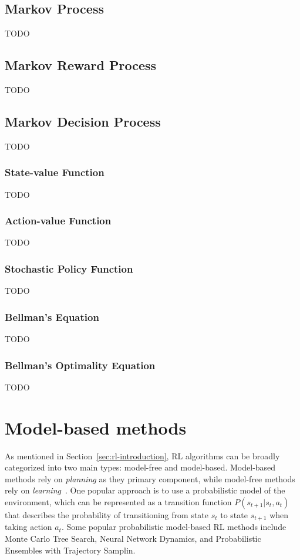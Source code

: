 \documentclass[../chapters.tex]{subfiles}
\begin{document}
    \subsection{Markov Process}\label{subsec:markov-process}
    TODO

    \subsection{Markov Reward Process}\label{subsec:markov-reward-process}
    TODO

    \subsection{Markov Decision Process}\label{subsec:markov-decision-process}
    TODO

    \subsubsection{State-value Function}\label{subsubsec:state-value-function}
    TODO

    \subsubsection{Action-value Function}\label{subsubsec:action-value-function}
    TODO

    \subsubsection{Stochastic Policy Function}\label{subsubsec:stochastic-policy-function}
    TODO

    \subsubsection{Bellman's Equation}\label{subsec:bellman-equation}
    TODO

    \subsubsection{Bellman's Optimality Equation}\label{subsec:bellman-optimality-equation}
    TODO


    \section{Model-based methods}
    As mentioned in Section~\ref{sec:rl-introduction}, RL algorithms can be broadly categorized into two main types: model-free and model-based.
    Model-based methods rely on \emph{planning} as they primary component, while model-free methods rely on \emph{learning}~\cite{sutton2018reinforcement}.
    One popular approach is to use a probabilistic model of the environment, which can be represented as a transition function $P(s_{t+1}|s_t, a_t)$ that describes the probability of transitioning from state $s_t$ to state $s_{t+1}$ when taking action $a_t$.
    Some popular probabilistic model-based RL methods include Monte Carlo Tree Search, Neural Network Dynamics, and Probabilistic Ensembles with Trajectory Samplin.
\end{document}
